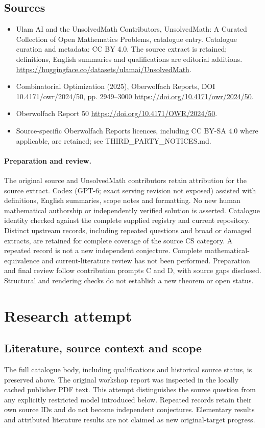 \documentclass[11pt]{article}
\begin{document}
\subsection{Sources}
\begin{itemize}
\item[S1] Ulam AI and the UnsolvedMath Contributors, UnsolvedMath: A Curated Collection of Open Mathematics Problems, catalogue entry. Catalogue curation and metadata: CC BY 4.0. The source extract is retained; definitions, English summaries and qualifications are editorial additions.
\url{https://huggingface.co/datasets/ulamai/UnsolvedMath}.
\item[S2] Combinatorial Optimization (2025), Oberwolfach Reports, DOI 10.4171/owr/2024/50, pp. 2949--3000
\url{https://doi.org/10.4171/owr/2024/50}.
\item[S3] Oberwolfach Report 50
\url{https://doi.org/10.4171/OWR/2024/50}.
\item Source-specific Oberwolfach Reports licences, including CC BY-SA 4.0 where applicable, are retained; see THIRD\_PARTY\_NOTICES.md.
\end{itemize}
\paragraph{Preparation and review.}
The original source and UnsolvedMath contributors retain attribution for the source extract. Codex (GPT-6; exact serving revision not exposed) assisted with definitions, English summaries, scope notes and formatting. No new human mathematical authorship or independently verified solution is asserted. Catalogue identity checked against the complete supplied registry and current repository. Distinct upstream records, including repeated questions and broad or damaged extracts, are retained for complete coverage of the source CS category. A repeated record is not a new independent conjecture. Complete mathematical-equivalence and current-literature review has not been performed. Preparation and final review follow contribution prompts C and D, with source gaps disclosed. Structural and rendering checks do not establish a new theorem or open status.
\label{end:statement}

\section{Research attempt}
\subsection{Literature, source context and scope}
The full catalogue body, including qualifications and historical source status, is preserved above. The original workshop report was inspected in the locally cached publisher PDF text. This attempt distinguishes the source question from any explicitly restricted model introduced below. Repeated records retain their own source IDs and do not become independent conjectures. Elementary results and attributed literature results are not claimed as new original-target progress.
\end{document}
